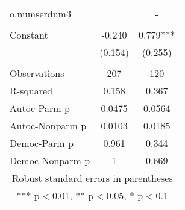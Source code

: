 \documentclass[]{article}
\begin{document}
\begin{tabular}{lcc}
o.numserdum3 &  & - \\
 &  &  \\
Constant & -0.240 & 0.779*** \\
 & (0.154) & (0.255) \\
 &  &  \\
Observations & 207 & 120 \\
R-squared & 0.158 & 0.367 \\
Autoc-Parm p & 0.0475 & 0.0564 \\
Autoc-Nonparm p & 0.0103 & 0.0185 \\
Democ-Parm p & 0.961 & 0.344 \\
 Democ-Nonparm p & 1 & 0.669 \\ \hline
\multicolumn{3}{c}{ Robust standard errors in parentheses} \\
\multicolumn{3}{c}{ *** p$<$0.01, ** p$<$0.05, * p$<$0.1} \\
\end{tabular}
\end{document}
